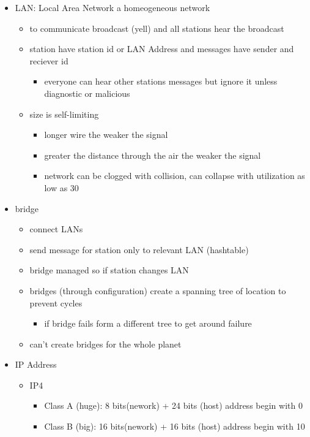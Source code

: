 \documentclass[11pt]{article}
\begin{document}
\begin{itemize}
  \item LAN:  Local Area Network a homeogeneous network
  \begin{itemize}
    \item to communicate broadcast (yell) and all stations hear the broadcast
    \item station have station id or LAN Address and messages have sender and reciever id
    \begin{itemize}
      \item everyone can hear other stations messages but ignore it unless diagnostic or malicious
    \end{itemize}
    \item size is self-limiting
    \begin{itemize}
      \item longer wire the weaker the signal
      \item greater the distance through the air the weaker the signal
      \item network can be clogged with collision, can collapse with utilization as low as 30%
    \end{itemize}
  \end{itemize}
  \item bridge
  \begin{itemize}
    \item connect LANs
    \item send message for station only to relevant LAN (hashtable)
    \item bridge managed so if station changes LAN
    \item bridges (through configuration) create a spanning tree of location to prevent cycles
    \begin{itemize}
      \item if bridge fails form a different tree to get around failure
    \end{itemize}
    \item can't create bridges for the whole planet
  \end{itemize}
  \item IP Address
  \begin{itemize}
    \item IP4
    \begin{itemize}
      \item Class A (huge): 8 bits(nework) + 24 bits (host) address begin with 0
      \item Class B (big): 16 bits(nework) + 16 bits (host) address begin with 10

\end{itemize}
\end{itemize}
\end{itemize}
\end{document}
